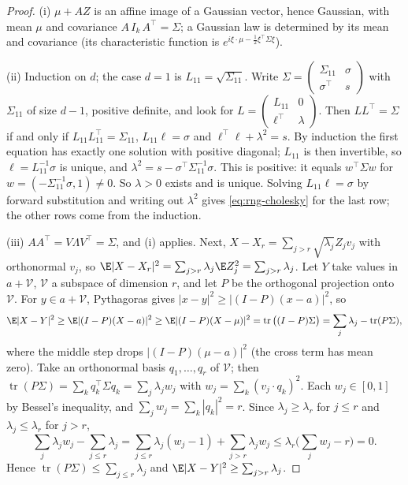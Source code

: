 \begin{proof}
(i) $\mu+AZ$ is an affine image of a Gaussian vector, hence Gaussian, with mean $\mu$ and
covariance $A\,I_k\,A^\top=\Sigma$; a Gaussian law is determined by its mean and covariance
(its characteristic function is $e^{i\xi\cdot\mu-\frac12\xi^\top\Sigma\xi}$).

(ii) Induction on $d$; the case $d=1$ is $L_{11}=\sqrt{\Sigma_{11}}$. Write
$\Sigma=\begin{pmatrix}\Sigma_{11}&\sigma\\\sigma^\top&s\end{pmatrix}$ with $\Sigma_{11}$ of
size $d-1$, positive definite, and look for $L=\begin{pmatrix}L_{11}&0\\\ell^\top&\lambda\end{pmatrix}$.
Then $LL^\top=\Sigma$ if and only if $L_{11}L_{11}^\top=\Sigma_{11}$, $L_{11}\ell=\sigma$ and
$\ell^\top\ell+\lambda^2=s$. By induction the first equation has exactly one solution with
positive diagonal; $L_{11}$ is then invertible, so $\ell=L_{11}^{-1}\sigma$ is unique, and
$\lambda^2=s-\sigma^\top\Sigma_{11}^{-1}\sigma$. This is positive: it equals $w^\top\Sigma w$
for $w=(-\Sigma_{11}^{-1}\sigma,1)\ne0$. So $\lambda>0$ exists and is unique. Solving
$L_{11}\ell=\sigma$ by forward substitution and writing out $\lambda^2$ gives
\eqref{eq:rng-cholesky} for the last row; the other rows come from the induction.

(iii) $AA^\top=V\Lambda V^\top=\Sigma$, and (i) applies. Next,
$X-X_r=\sum_{j>r}\sqrt{\lambda_j}Z_jv_j$ with orthonormal $v_j$, so
$\E|X-X_r|^2=\sum_{j>r}\lambda_j\E Z_j^2=\sum_{j>r}\lambda_j$. Let $Y$ take values in
$a+\mathcal V$, $\mathcal V$ a subspace of dimension $r$, and let $P$ be the orthogonal
projection onto $\mathcal V$. For $y\in a+\mathcal V$, Pythagoras gives
$|x-y|^2\ge|(I-P)(x-a)|^2$, so
\[
  \E|X-Y|^2\ge\E|(I-P)(X-a)|^2\ge\E|(I-P)(X-\mu)|^2=\operatorname{tr}\big((I-P)\Sigma\big)
  =\sum_j\lambda_j-\operatorname{tr}(P\Sigma),
\]
where the middle step drops $|(I-P)(\mu-a)|^2$ (the cross term has mean zero). Take an orthonormal basis
$q_1,\dots,q_r$ of $\mathcal V$; then $\operatorname{tr}(P\Sigma)=\sum_kq_k^\top\Sigma q_k=\sum_j\lambda_jw_j$
with $w_j=\sum_k(v_j\cdot q_k)^2$. Each $w_j\in[0,1]$ by Bessel's inequality, and
$\sum_jw_j=\sum_k|q_k|^2=r$. Since $\lambda_j\ge\lambda_r$ for $j\le r$ and $\lambda_j\le\lambda_r$ for $j>r$,
\[
  \sum_j\lambda_jw_j-\sum_{j\le r}\lambda_j=\sum_{j\le r}\lambda_j(w_j-1)+\sum_{j>r}\lambda_jw_j
  \le\lambda_r\Big(\sum_jw_j-r\Big)=0 .
\]
Hence $\operatorname{tr}(P\Sigma)\le\sum_{j\le r}\lambda_j$ and $\E|X-Y|^2\ge\sum_{j>r}\lambda_j$.
\end{proof}

